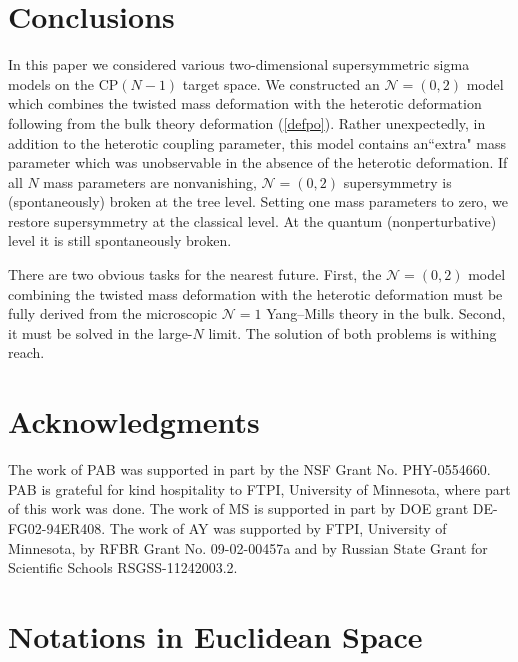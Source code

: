 \documentclass[12pt]{article}
\newcommand{\ntwoo}{${\mathcal N}= \left(0,2\right) $ }
\newcommand{\none}{${\mathcal N}=1$ }
\begin{document}
	
\section{Conclusions}
\label{con}

In this paper we considered various two-dimensional supersymmetric sigma models on the CP$(N-1)$
target space. We constructed an \ntwoo  model which combines the twisted mass deformation 
with the heterotic deformation following from
the bulk theory deformation (\ref{defpo}). Rather unexpectedly, in addition to the heterotic coupling parameter,
this model  contains an``extra" mass parameter which was unobservable in the absence of the heterotic deformation.
If all $N$ mass parameters are nonvanishing, \ntwoo supersymmetry is (spontaneously) broken at
the tree level. Setting one  mass parameters to zero, we restore supersymmetry at the classical 
level. At the quantum (nonperturbative) level it is still spontaneously broken.

There are two obvious tasks for the nearest future. First, the \ntwoo  model   combining the twisted mass deformation 
with the heterotic deformation must be fully derived from the microscopic \none Yang--Mills theory in the bulk.
Second, it must be solved in the large-$N$ limit. The solution of both problems is withing reach.
	
	
\section*{Acknowledgments}
The work of PAB was supported in part by the NSF Grant No. PHY-0554660. PAB is grateful for kind
hospitality to FTPI, University of Minnesota, where part of this work was done. 
The work of MS is supported in part by DOE grant DE-FG02-94ER408. 
The work of AY was  supported 
by  FTPI, University of Minnesota, 
by RFBR Grant No. 09-02-00457a 
and by Russian State Grant for 
Scientific Schools RSGSS-11242003.2.

\newpage

\setcounter{section}{0}
\renewcommand{\thesection}{\Alph{section}}

\section{Notations in Euclidean Space}
\label{app:eucl}
%
%
\end{document}
